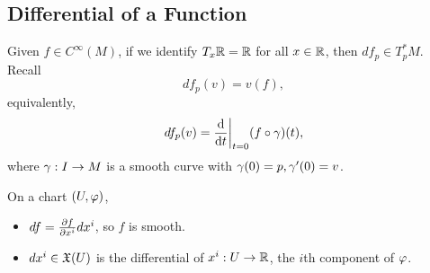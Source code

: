 \subsection{Differential of a Function}
Given $f \in C^\infty(M)$, if we identify $T_x\mathbb{R} = \mathbb{R}$ for all $x \in \mathbb{R}$, then $df_p \in T_p^*M$. Recall 
$$df_p(v) = v(f), $$ equivalently, 
$$df_p(v) = \dv{}{t}\bigg|_{t=0} (f \circ \gamma)(t), $$ where $\gamma:I \to M$ is a smooth curve with $\gamma(0) = p, \gamma'(0) = v$. 
\begin{remark}
    On a chart $(U,\varphi)$, 
    \begin{itemize}
    \item $df = \pdv{f}{x^i} dx^i$, so $f$ is smooth. 
    \item $dx^i \in \frak{X}(U)$ is the differential of $x^i:U \to \mathbb{R}$, the $i$th component of $\varphi$. 
    \end{itemize}
\end{remark}